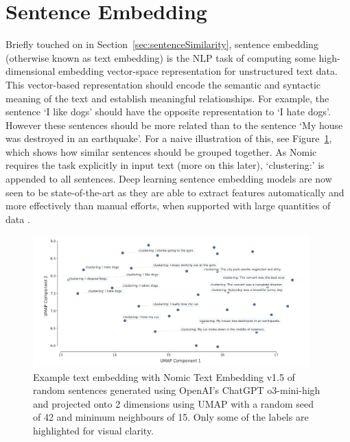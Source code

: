 \documentclass[10pt,oneside]{report}
\begin{document}
\section{Sentence Embedding}\label{sec:sentenceEmbedding}
Briefly touched on in Section~\ref{sec:sentenceSimilarity}, sentence embedding (otherwise known as text embedding) is the NLP task of computing some high-dimensional embedding vector-space representation for unstructured text data. This vector-based representation should encode the semantic and syntactic meaning of the text and establish meaningful relationships. For example, the sentence `I like dogs' should have the opposite representation to `I hate dogs'.  However these sentences should be more related than to the sentence `My house was destroyed in an earthquake'. For a naive illustration of this, see Figure~\ref{fig:sentenceEmbeddingExample}, which shows how similar sentences should be grouped together. As Nomic requires the task explicitly in input text (more on this later), `clustering:' is appended to all sentences. Deep learning sentence embedding models are now seen to be state-of-the-art as they are able to extract features automatically and more effectively than manual efforts, when supported with large quantities of data \cite{liang2017text}.

\begin{figure}[htbp]
    \centering
    \includegraphics[width=0.95\textwidth]{sentenceEmbeddingExample1.png}
    \caption{Example text embedding with Nomic Text Embedding v1.5 \cite{nussbaum2024nomic} of random sentences generated using OpenAI's ChatGPT o3-mini-high and projected onto 2 dimensions using UMAP \cite{mcinnes2018umap} with a random seed of 42 and minimum neighbours of 15. Only some of the labels are highlighted for visual clarity.}\label{fig:sentenceEmbeddingExample}
\end{figure}
\end{document}

